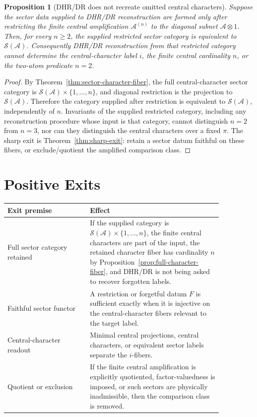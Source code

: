 \documentclass[12pt]{article}
\newtheorem{proposition}{Proposition}
\theoremstyle{remark}
\newcommand{\A}{\mathcal A}
\newcommand{\Sectors}{\mathcal S}
\begin{document}
\begin{proposition}[DHR/DR does not recreate omitted central characters]
\label{prop:dr-boundary}
Suppose the sector data supplied to DHR/DR reconstruction are formed only
after restricting the finite central amplification \(\A^{(n)}\) to the
diagonal subnet \(\A\otimes1\).  Then, for every \(n\ge2\), the supplied
restricted sector category is equivalent to \(\Sectors(\A)\).  Consequently
DHR/DR reconstruction from that restricted category cannot determine the
central-character label \(i\), the finite central cardinality \(n\), or the
two-atom predicate \(n=2\).
\end{proposition}

\begin{proof}
By Theorem~\ref{thm:sector-character-fiber}, the full central-character sector
category is \(\Sectors(\A)\times\{1,\ldots,n\}\), and diagonal restriction is
the projection to \(\Sectors(\A)\).  Therefore the category supplied after
restriction is equivalent to \(\Sectors(\A)\), independently of \(n\).
Invariants of the supplied restricted category, including any reconstruction
procedure whose input is that category, cannot distinguish \(n=2\) from
\(n=3\), nor can they distinguish the central characters over a fixed
\(\pi\).  The sharp exit is Theorem~\ref{thm:sharp-exit}: retain a sector datum
faithful on these fibers, or exclude/quotient the amplified comparison class.
\end{proof}

\section{Positive Exits}

\begin{center}
\begin{tabular}{p{0.33\linewidth}p{0.53\linewidth}}
\toprule
Exit premise & Effect \\
\midrule
Full sector category retained & If the supplied category is
\(\Sectors(\A)\times\{1,\ldots,n\}\), the finite central characters are part of
the input, the retained character fiber has cardinality \(n\) by
Proposition~\ref{prop:full-character-fiber}, and DHR/DR is not being asked to
recover forgotten labels. \\
\addlinespace
Faithful sector functor & A restriction or forgetful datum \(F\) is sufficient
exactly when it is injective on the central-character fibers relevant to the
target label. \\
\addlinespace
Central-character readout & Minimal central projections, central characters,
or equivalent sector labels separate the \(i\)-fibers. \\
\addlinespace
Quotient or exclusion & If the finite central amplification is
explicitly quotiented, factor-valuedness is imposed, or such sectors are
physically inadmissible, then the comparison class is removed. \\
\bottomrule
\end{tabular}
\end{center}
\end{document}
